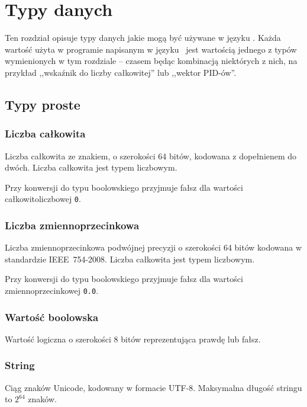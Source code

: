 \section{Typy danych}
\label{viuact_spec_datatypes}

Ten rozdział opisuje typy danych jakie mogą być używane w języku \ViuAct. Każda
wartość użyta w programie napisanym w języku \ViuAct\ jest wartością jednego z
typów wymienionych w tym rozdziale -- czasem będąc kombinacją niektórych z nich,
na przykład ,,wskaźnik do liczby całkowitej'' lub ,,wektor PID-ów''.

\subsection{Typy proste}

\subsubsection{Liczba całkowita}
\label{viuact_spec_datatypes_simple_integer}

Liczba całkowita ze znakiem, o szerokości 64 bitów, kodowana z dopełnienem do
dwóch. Liczba całkowita jest typem liczbowym.

Przy konwersji do typu boolowskiego przyjmuje fałsz dla wartości
całkowitoliczbowej \texttt{0}.

\subsubsection{Liczba zmiennoprzecinkowa}

Liczba zmiennoprzecinkowa podwójnej precyzji o szerokości 64 bitów kodowana w
standardzie IEEE~754-2008. Liczba całkowita jest typem liczbowym.

Przy konwersji do typu boolowskiego przyjmuje fałsz dla wartości
zmiennoprzecinkowej \texttt{0.0}.

\subsubsection{Wartość boolowska}

Wartość logiczna o szerokości 8 bitów reprezentująca prawdę lub fałsz.

\subsubsection{String}

Ciąg znaków Unicode, kodowany w formacie UTF-8. Maksymalna długość stringu to
$2^{64}$ znaków.

